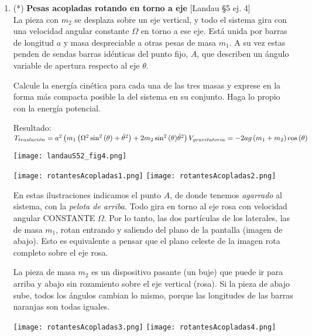 \documentclass[11pt, spanish, a4paper, twoside]{article}
\begin{document}
\begin{enumerate}
\item
	\begin{minipage}[t][7cm]{0.65\textwidth}
		(*) \textbf{Pesas acopladas rotando en torno a eje} [Landau \S5 ej. 4]\\

		La pieza con \(m_2\) se desplaza sobre un eje vertical, y todo el sistema gira con una velocidad angular constante \(\Omega\) en torno a ese eje.
		Está unida por barras de longitud \(a\) y masa despreciable a otras pesas de masa \(m_1\).
		A su vez estas penden de sendas barras idénticas del punto fijo, \(A\), que describen un ángulo variable de apertura respecto al eje \(\theta\).

		Calcule la energía cinética para cada una de las tres masas y exprese en la forma más compacta posible la del sistema en su conjunto.
		Haga lo propio con la energía potencial.

		Resultado:\\
		\(
			T_{traslaci\acute{o}n} = a^{2} \left( m_{1} \left( \Omega^{2} \sin^{2}{\left(\theta \right)} + \dot{\theta}^{2}\right) + 2 m_{2} \sin^{2}{\left(\theta \right)} \dot{\theta}^{2} \right) \\
			V_{gravitatoria} = - 2 a g \left(m_{1} + m_{2}\right) \cos{\left(\theta \right)}
		\)
	\end{minipage}
	\begin{minipage}[c][1cm][t]{0.35\textwidth}
		\texttt{[image: landauS52\_fig4.png]}
	\end{minipage}

	\begin{center}
		\texttt{[image: rotantesAcopladas1.png]}
		\texttt{[image: rotantesAcopladas2.png]}
	\end{center}

	En estas ilustraciones indicamos el punto \(A\), de donde tenemos \emph{agarrado} al sistema, con la \emph{pelota de arriba}.
	Todo gira en torno al eje rosa con velocidad angular CONSTANTE $\Omega$.
	Por lo tanto, las dos partículas de los laterales, las de masa $m_1$, rotan entrando y saliendo del plano de la pantalla (imagen de abajo).
	Esto es equivalente a pensar que el plano celeste de la imagen rota completo sobre el eje rosa.
	
	La pieza de masa $m_2$ es un dispositivo pasante (un buje) que puede ir para arriba y abajo sin rozamiento sobre el eje vertical (rosa).
	Si la pieza de abajo sube, todos los ángulos cambian lo mismo, porque las longitudes de las barras naranjas son todas iguales.
	
	\begin{center}
		\texttt{[image: rotantesAcopladas3.png]}
		\texttt{[image: rotantesAcopladas4.png]}
	\end{center}
	

\end{enumerate}
\end{document}
